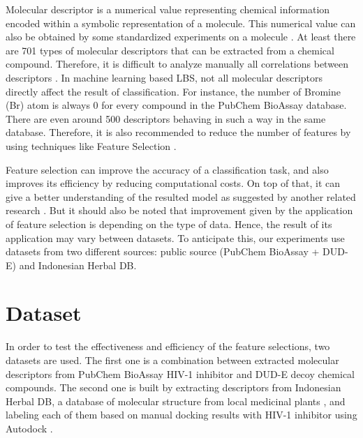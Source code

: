 \documentclass[conference,compsoc,12pt]{IEEEtran}
\begin{document}
	Molecular descriptor is a numerical value representing chemical information encoded within a symbolic representation of a molecule. This numerical value can also be obtained by some standardized experiments on a molecule \cite{yap2011padel}. At least there are 701 types of molecular descriptors that can be extracted from a chemical compound. Therefore, it is difficult to analyze manually all correlations between descriptors \cite{korkmaz2014drug}. In machine learning based LBS, not all molecular descriptors directly affect the result of classification. For instance, the number of Bromine (Br) atom is always 0 for every compound in the PubChem BioAssay database. There are even around 500 descriptors behaving in such a way in the same database. Therefore, it is also recommended to reduce the number of features by using techniques like Feature Selection \cite{korkmaz2014drug}.
	
	Feature selection can improve the accuracy of a classification task, and also improves its efficiency by reducing computational costs. On top of that, it can give a better understanding of the resulted model as suggested by another related research \cite{janecek2008relationship}. But it should also be noted that improvement given by the application of feature selection is depending on the type of data. Hence, the result of its application may vary between datasets\cite{janecek2008relationship}. To anticipate this, our experiments use datasets from two different sources: public source (PubChem BioAssay + DUD-E) and Indonesian Herbal DB.
	
	\section{Dataset} \label{Dataset}
	
	In order to test the effectiveness and efficiency of the feature selections, two datasets are used. The first one is a combination between extracted molecular descriptors from PubChem BioAssay HIV-1 inhibitor \cite{bioassay2014update} and DUD-E decoy chemical compounds\cite{mysinger2012directory}. The second one is built by extracting descriptors from Indonesian Herbal DB, a database of molecular structure from local medicinal plants \cite{yanuar2011medicinal}, and labeling each of them based on manual docking results with HIV-1 inhibitor using Autodock \cite{morris2009autodock4}.  
	
\end{document}
